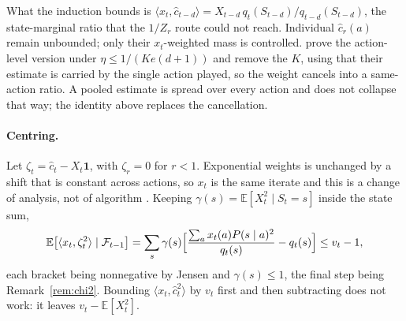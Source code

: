 \documentclass{article}
\theoremstyle{remark}
\newcommand{\Ex}{\mathbb{E}}
\begin{document}
What the induction bounds is
$\langle x_t,\hat c_{t-d}\rangle=X_{t-d}\,q_t(S_{t-d})/q_{t-d}(S_{t-d})$, the state-marginal ratio that the
$1/Z_r$ route could not reach. Individual $\hat c_r(a)$ remain unbounded; only their
$x_t$-weighted mass is controlled. \citet{cesabianchi2019} prove the action-level version under
$\eta\le1/(Ke(d+1))$ and \citet{thune2019} remove the $K$, using that their estimate is carried by
the single action played, so the weight cancels into a same-action ratio. A pooled estimate is
spread over every action and does not collapse that way; the identity above replaces the
cancellation.

\paragraph{Centring.} Let $\zeta_t=\hat c_t-X_t\mathbf 1$, with $\zeta_r=0$ for $r<1$. Exponential
weights is unchanged by a shift that is constant across actions, so $x_t$ is the same iterate and
this is a change of analysis, not of algorithm \citep{eldowa2024}. Keeping
$\gamma(s)=\Ex[X_t^2\mid S_t=s]$ inside the state sum,
\[
\Ex\bigl[\langle x_t,\zeta_t^2\rangle\mid\mathcal F_{t-1}\bigr]
=\sum_s\gamma(s)\Bigl[\frac{\sum_ax_t(a)P(s\mid a)^2}{q_t(s)}-q_t(s)\Bigr]\le v_t-1,
\]
each bracket being nonnegative by Jensen and $\gamma(s)\le1$, the final step being
Remark~\ref{rem:chi2}. Bounding $\langle x_t,\hat c_t^2\rangle$ by $v_t$ first and then subtracting
does not work: it leaves $v_t-\Ex[X_t^2]$.
\end{document}
